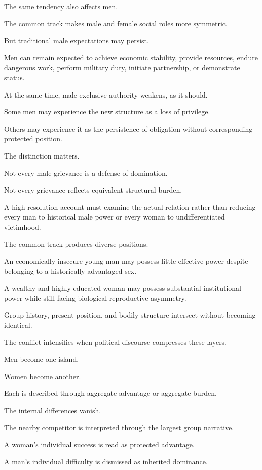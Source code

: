The same tendency also affects men.

The common track makes male and female social roles more symmetric.

But traditional male expectations may persist.

Men can remain expected to achieve economic stability, provide resources, endure dangerous work, perform military duty, initiate partnership, or demonstrate status.

At the same time, male-exclusive authority weakens, as it should.

Some men may experience the new structure as a loss of privilege.

Others may experience it as the persistence of obligation without corresponding protected position.

The distinction matters.

Not every male grievance is a defense of domination.

Not every grievance reflects equivalent structural burden.

A high-resolution account must examine the actual relation rather than reducing every man to historical male power or every woman to undifferentiated victimhood.

The common track produces diverse positions.

An economically insecure young man may possess little effective power despite belonging to a historically advantaged sex.

A wealthy and highly educated woman may possess substantial institutional power while still facing biological reproductive asymmetry.

Group history, present position, and bodily structure intersect without becoming identical.

The conflict intensifies when political discourse compresses these layers.

Men become one island.

Women become another.

Each is described through aggregate advantage or aggregate burden.

The internal differences vanish.

The nearby competitor is interpreted through the largest group narrative.

A woman’s individual success is read as protected advantage.

A man’s individual difficulty is dismissed as inherited dominance.

